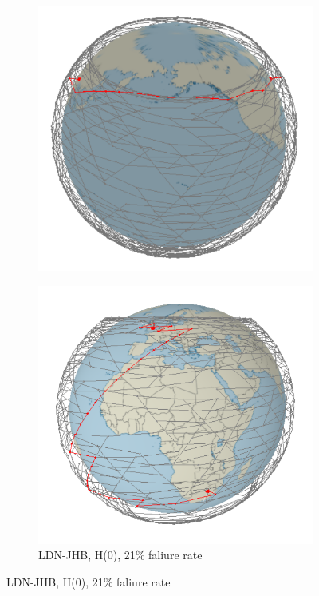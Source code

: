 \documentclass[12pt,a4paper,twoside,openright]{report}
\begin{document}
\begin{figure}
\begin{subfigure}[b]{0.4\textwidth}
		\includegraphics[width=\textwidth]{NewYorkBeijing1320SatellitesLM2}
	\end{subfigure}
	
	\begin{subfigure}[b]{\textwidth}
		\caption{LDN-JHB, H(0), 21\% faliure rate}
		\includegraphics[width=\textwidth]{LondonJohannasburg1254SatellitesLM2}
	\end{subfigure}
\end{figure}
\end{document}
